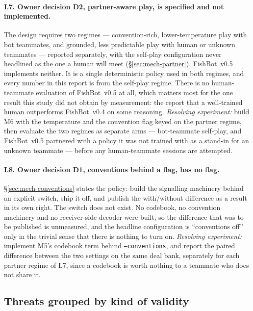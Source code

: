 \documentclass[11pt]{article}
\theoremstyle{definition}
\DeclareRobustCommand{\vfive}{\texorpdfstring{\mbox{FishBot v0.5}}{FishBot v0.5}}
\DeclareRobustCommand{\vfour}{\texorpdfstring{\mbox{FishBot v0.4}}{FishBot v0.4}}
\begin{document}
\paragraph{L7. Owner decision D2, partner-aware play, is specified and not
implemented.} The design requires two regimes --- convention-rich,
lower-temperature play with bot teammates, and grounded, less predictable play
with human or unknown teammates --- reported separately, with the self-play
configuration never headlined as the one a human will meet
(\S\ref{sec:mech-partner}). \vfive{} implements neither. It is a single
deterministic policy used in both regimes, and every number in this report is
from the self-play regime. There is no human-teammate evaluation of \vfive{} at
all, which matters most for the one result this study did not obtain by
measurement: the report that a well-trained human outperforms \vfour{} on some
reasoning. \emph{Resolving experiment:} build M6 with the temperature and the
convention flag keyed on the partner regime, then evaluate the two regimes as
separate arms --- bot-teammate self-play, and \vfive{} partnered with a policy it
was not trained with as a stand-in for an unknown teammate --- before any
human-teammate sessions are attempted.

\paragraph{L8. Owner decision D1, conventions behind a flag, has no flag.}
\S\ref{sec:mech-conventions} states the policy: build the signalling machinery
behind an explicit switch, ship it off, and publish the with/without difference
as a result in its own right. The switch does not exist. No codebook, no
convention machinery and no receiver-side decoder were built, so the difference
that was to be published is unmeasured, and the headline configuration is
``conventions off'' only in the trivial sense that there is nothing to turn on.
\emph{Resolving experiment:} implement M5's codebook term behind
\texttt{--conventions}, and report the paired difference between the two settings
on the same deal bank, separately for each partner regime of L7, since a
codebook is worth nothing to a teammate who does not share it.

\subsection{Threats grouped by kind of validity}
\label{sec:lim-validity}
\end{document}
